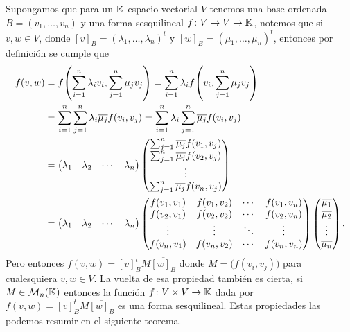 Supongamos que para un $\mathbb{K}$-espacio vectorial $V$ tenemos una base ordenada $B = (v_1, \ldots, v_n)$ y una forma sesquilineal $f\colon V\to V \to\mathbb{K}$, notemos que si $v,w \in V$, donde $[v]_B = (\lambda_1, \ldots,\lambda_n)^t$ y $[w]_B = (\mu_1, \ldots,\mu_n)^t$, entonces por definición se cumple que
\begin{align*}
  f(v,w) &= f\paren{ \sum_{i=1}^n \lambda_i v_i, \sum_{j=1}^n \mu_j v_j } 
     = \sum_{i=1}^n \lambda_i  f\paren{ v_i, \sum_{j=1}^n \mu_j v_j } \\
    &= \sum_{i=1}^n  \sum_{j=1}^n  \lambda_i\overline{\mu_j} f\paren{ v_i, v_j } 
     = \sum_{i=1}^n \lambda_i \sum_{j=1}^n  \overline{\mu_j} f\paren{ v_i, v_j } \\
    &= \begin{pmatrix} \lambda_1 & \lambda_2 & \cdots & \lambda_n \end{pmatrix}
       \begin{pmatrix} \sum_{j=1}^n \overline{\mu_j} f(v_1,v_j) \\
        \sum_{j=1}^n \overline{\mu_j} f(v_2,v_j) \\
        \vdots \\
        \sum_{j=1}^n \overline{\mu_j} f(v_n,v_j) 
       \end{pmatrix} \\
    &= \begin{pmatrix} \lambda_1 & \lambda_2 & \cdots & \lambda_n \end{pmatrix}
       \begin{pmatrix}
        f(v_1, v_1)  & f(v_1, v_2) & \cdots & f(v_1, v_n) \\
        f(v_2, v_1)  & f(v_2, v_2) & \cdots & f(v_2, v_n) \\
        \vdots & \vdots & \ddots & \vdots \\
        f(v_n, v_1)  & f(v_n, v_2) & \cdots & f(v_n, v_n) \\
       \end{pmatrix}
      \begin{pmatrix} \overline{\mu_1} \\ \overline{\mu_2} \\ \vdots \\ \overline{\mu_n} \end{pmatrix}.
\end{align*}
Pero entonces $f(v,w) = [v]_B^t M \overline{[w]_B}$ donde $M = \bigl(f(v_i,v_j)\bigr)$ para cualesquiera $v,w \in V$. La vuelta de esa propiedad también es cierta, si $M \in \mathcal{M}_n(\mathbb{K})$ entonces la función $f\colon V\times V \to \mathbb{K}$ dada por $f(v,w) = [v]_B^t M \overline{[w]_B}$ es una forma sesquilineal. Estas propiedades las podemos resumir en el siguiente teorema.

